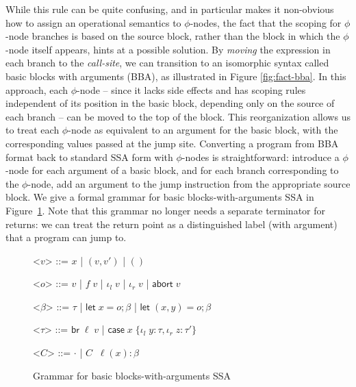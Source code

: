 \documentclass[acmsmall,screen,review]{acmart}
\newcommand{\ms}[1]{\ensuremath{\mathsf{#1}}}
\newcommand{\lto}{:}
\newcommand{\linl}[1]{\iota_l\;{#1}}
\newcommand{\linr}[1]{\iota_r\;{#1}}
\newcommand{\labort}[1]{\ms{abort}\;{#1}}
\newcommand{\letstmt}[3]{\ensuremath{\ms{let}\;#1 = #2; #3}}
\newcommand{\brb}[2]{\ms{br}\;#1\;#2}
\newcommand{\casestmt}[5]{\ms{case}\;#1\;\{\linl{#2} \lto #3, \linr{#4} \lto #5\}}
\begin{document}
While this rule can be quite confusing, and in particular makes it non-obvious how to assign an
operational semantics to $\phi$-nodes, the fact that the scoping for $\phi$-node branches is based
on the source block, rather than the block in which the $\phi$-node itself appears, hints at a
possible solution. By \emph{moving} the expression in each branch to the \emph{call-site}, we can
transition to an isomorphic syntax called basic blocks with arguments (BBA), as illustrated in
Figure \ref{fig:fact-bba}. In this approach, each $\phi$-node -- since it lacks side effects and has
scoping rules independent of its position in the basic block, depending only on the source of each
branch -- can be moved to the top of the block. This reorganization allows us to treat each
$\phi$-node as equivalent to an argument for the basic block, with the corresponding values passed
at the jump site. Converting a program from BBA format back to standard SSA form with $\phi$-nodes
is straightforward: introduce a $\phi$-node for each argument of a basic block, and for each branch
corresponding to the $\phi$-node, add an argument to the jump instruction from the appropriate
source block. We give a formal grammar for basic blocks-with-arguments SSA in
Figure~\ref{fig:bba-grammar}. Note that this grammar no longer needs a separate terminator for
returns: we can treat the return point as a distinguished label (with argument) that a program can jump to. 

\begin{figure}[H]
  \begin{center}
    \begin{grammar}
      <\(v\)> ::= \(x\) \;|\; \((v, v')\) \;|\; \(()\)

      <\(o\)> ::= \(v\) \;|\; \(f\;v\) \;|\; \(\linl{v}\) \;|\; \(\linr{v}\) \;|\; \(\labort{v}\)

      <\(\beta\)> ::= \(\tau\) 
      \;|\; \(\letstmt{x}{o}{\beta}\)
      \;|\; \(\letstmt{(x, y)}{o}{\beta}\)

      <\(\tau\)> ::= \(\brb{\ell}{v}\) \;|\; $\casestmt{x}{y}{\tau}{z}{\tau'}$
      
      <\(C\)> ::= \(\cdot\) \;|\; \(C \;\; \ell(x) : \beta\)
    \end{grammar}
  \end{center}
  \caption{Grammar for basic blocks-with-arguments SSA} 
  \Description{}
  \label{fig:bba-grammar}
\end{figure}
\end{document}
